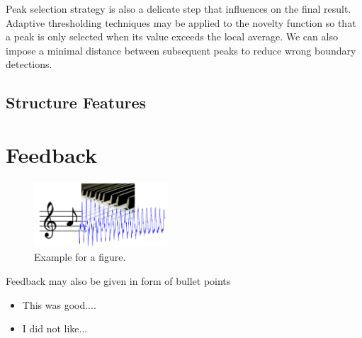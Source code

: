 \documentclass[a4paper, 9pt, twocolumn]{extarticle}
\begin{document}
Peak selection strategy is also a delicate step that influences on the final result. Adaptive thresholding techniques may be applied to the novelty function so that a peak is only selected when its value exceeds the local average. We can also impose a minimal distance between subsequent peaks to reduce wrong boundary detections.

\subsection{Structure Features}
\label{subsection:structureFeatures}

\section{Feedback}
\label{section:feedback}


 \begin{figure}[h]
 \begin{center}
 \includegraphics[width=5cm]{images/figure_example.png}
 \end{center}
 \caption{
 Example for a figure.
 }
 \label{figure:example}
 \end{figure}


Feedback may also be given in form of bullet points
\begin{itemize}
\item This was good....
\item I did not like...
\end{itemize}




\small

\end{document}
